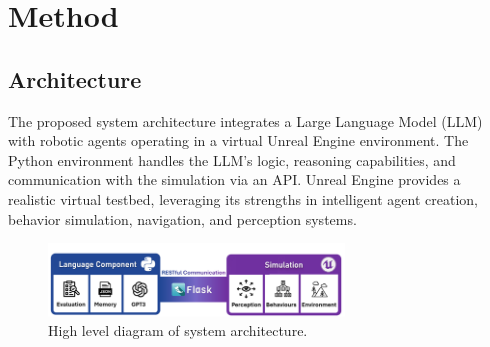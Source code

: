 \documentclass[pdflatex,sn-mathphys-num]{sn-jnl}%
\theoremstyle{thmstyleone}%
\theoremstyle{thmstyletwo}%
\theoremstyle{thmstylethree}%
\begin{document}
\section{Method}
\subsection{Architecture}
The proposed system architecture integrates a Large Language Model (LLM) with robotic agents operating in a virtual Unreal Engine environment. The Python environment handles the LLM's logic, reasoning capabilities, and communication with the simulation via an API. Unreal Engine provides a realistic virtual testbed, leveraging its strengths in intelligent agent creation, behavior simulation, navigation, and perception systems.

\begin{figure}[h]
\centering
\includegraphics[width=0.7\textwidth]{figures/Picture2.png}
\caption{High level diagram of system architecture.}\label{fig3}
\end{figure}
\end{document}
